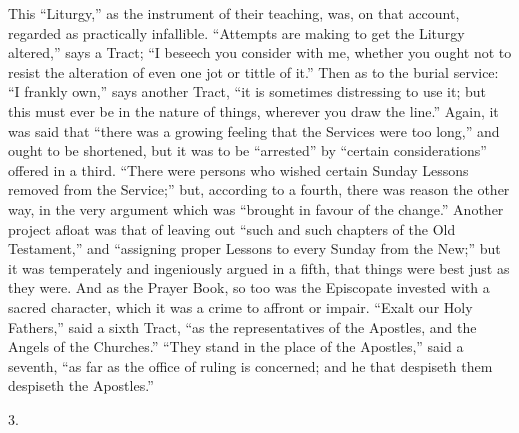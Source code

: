 This ``Liturgy,'' as the instrument of their teaching, was,
on that account, regarded as practically infallible. ``Attempts
are making to get the Liturgy altered,'' says a Tract; ``I
beseech you consider with me, whether you ought not to resist the
alteration of even one jot or tittle of it.'' Then as to the
burial service: ``I frankly own,'' says another Tract,
``it is sometimes distressing to use it; but this must ever be in
the nature of things, wherever you draw the line.'' Again, it was
said that ``there was a growing feeling that the Services were too
long,'' and ought to be shortened, but it was to be
``arrested'' by ``certain considerations'' offered in
a third. ``There were persons who wished certain Sunday Lessons
removed from the Service;'' but, according to a fourth, there was
reason the other way, in the very argument which was ``brought in
favour of the change.'' Another project afloat was that of leaving
out ``such and such chapters of the Old Testament,'' and
``assigning proper Lessons to every Sunday from the New;'' but
it was temperately and ingeniously argued in a fifth, that things were
best just as they were. And as the Prayer Book, so too was the
Episcopate invested with a sacred character, which it was a crime to
affront or impair. ``Exalt our Holy Fathers,'' said a sixth
Tract, ``as the representatives of the Apostles, and the Angels of
the Churches.'' ``They stand in the place of the
Apostles,'' said a seventh, ``as far as the office of ruling
is concerned; and he that despiseth them despiseth the Apostles.''

3.

